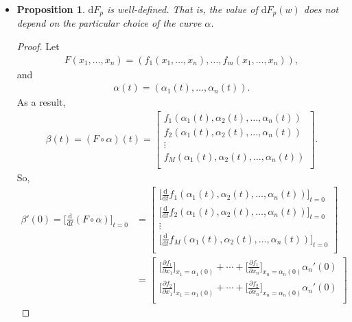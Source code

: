 \documentclass[10pt]{article}
\newtheorem{proposition}[lemma]{Proposition}
\newcommand{\dee}{\mathrm{d}}
\begin{document}
\begin{itemize}
    \item \begin{proposition}
      $\dee F_p$ is well-defined. That is, the value of $\dee F_p(w)$ does not depend on the particular choice of the curve $\alpha$.
    \end{proposition}    
    \begin{proof}
      Let 
      \begin{align*}
        F(x_1, \dotsc, x_n) = (f_1(x_1, \dotsc, x_n), \dotsc, f_m(x_1, \dotsc, x_n)),
      \end{align*}
      and
      \begin{align*}
        \alpha(t) = (\alpha_1(t), \dotsc, \alpha_n(t)).
      \end{align*}
      As a result,
      \begin{align*}
        \beta(t) = (F \circ \alpha)(t) 
        = \begin{bmatrix}
          f_1(\alpha_1(t), \alpha_2(t), \dotsc, \alpha_n(t))\\
          f_2(\alpha_1(t), \alpha_2(t), \dotsc, \alpha_n(t))\\
          \vdots\\
          f_M(\alpha_1(t), \alpha_2(t), \dotsc, \alpha_n(t))\\
        \end{bmatrix}.
      \end{align*}
      So,
      \begin{align*}
        \beta'(0) = \bigg[\frac{\dee}{\dee t}(F \circ \alpha) \bigg]_{t = 0}
        &= \begin{bmatrix}
          \big[\frac{\dee}{\dee t} f_1(\alpha_1(t), \alpha_2(t), \dotsc, \alpha_n(t)) \big]_{t=0}\\
          \big[\frac{\dee}{\dee t} f_2(\alpha_1(t), \alpha_2(t), \dotsc, \alpha_n(t)) \big]_{t=0}\\
          \vdots\\
          \big[\frac{\dee}{\dee t} f_M(\alpha_1(t), \alpha_2(t), \dotsc, \alpha_n(t)) \big]_{t=0}\\
        \end{bmatrix}\\
        &= \begin{bmatrix}
          \big[ \frac{\partial f_1}{\partial x_1}\big]_{x_1=\alpha_1(0)} + \dotsb + \big[ \frac{\partial f_1}{\partial x_n}\big]_{x_n=\alpha_n(0)} \alpha_n'(0) \\
          \big[ \frac{\partial f_2}{\partial x_1}\big]_{x_1=\alpha_1(0)} + \dotsb + \big[ \frac{\partial f_2}{\partial x_n}\big]_{x_n=\alpha_n(0)} \alpha_n'(0) \\

\end{bmatrix}
\end{align*}
\end{proof}
\end{itemize}
\end{document}

